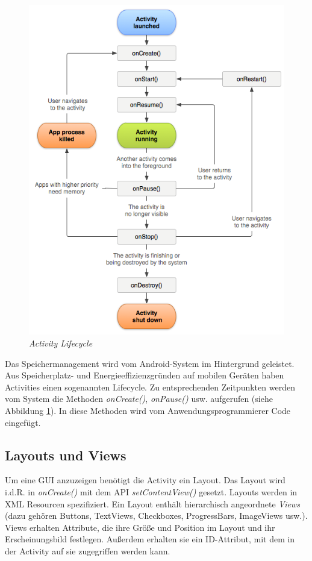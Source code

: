 \begin{figure}[ht]
\centering
\includegraphics[width=\textwidth]{../img/ActivityLifecycle.png}
\caption{\emph{Activity Lifecycle}}
\label{fig:activitylifecycle}
\end{figure}

Das Speichermanagement wird vom Android-System im Hintergrund geleistet. Aus Speicherplatz- und Energieeffizienzgründen auf mobilen Geräten haben Activities einen sogenannten Lifecycle. Zu entsprechenden Zeitpunkten werden vom System die Methoden \emph{onCreate()}, \emph{onPause()} usw. aufgerufen (siehe Abbildung \ref{fig:activitylifecycle}). In diese Methoden wird vom Anwendungsprogrammierer Code eingefügt.

\subsection{Layouts und Views}

Um eine GUI anzuzeigen benötigt die Activity ein Layout. Das Layout wird i.d.R. in \emph{onCreate()} mit dem API \emph{setContentView()} gesetzt. Layouts werden in XML Resourcen spezifiziert. Ein Layout enthält hierarchisch angeordnete \emph{Views} (dazu gehören Buttons, TextViews, Checkboxes, ProgressBars, ImageViews usw.). Views erhalten Attribute, die ihre Größe und Position im Layout und ihr Erscheinungsbild festlegen. Außerdem erhalten sie ein ID-Attribut, mit dem in der Activity auf sie zugegriffen werden kann.

